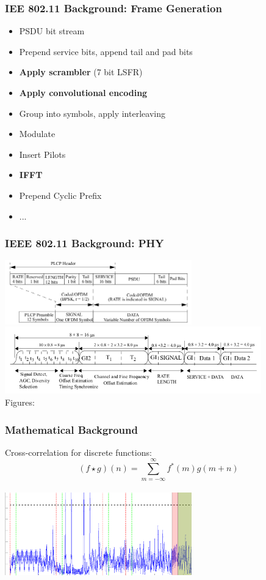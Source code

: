 \documentclass[accentcolor=tud8b,colorbacktitle]{tudbeamer}
\begin{document}
\begin{frame}
\frametitle{IEE 802.11 Background: Frame Generation}
\begin{itemize}
	\item PSDU bit stream
	\item Prepend service bits, append tail and pad bits
	\item \textbf{Apply scrambler} (7 bit LSFR)
	\item \textbf{Apply convolutional encoding}
	\item Group into symbols, apply interleaving
	\item Modulate
	\item Insert Pilots
	\item \textbf{IFFT}
	\item Prepend Cyclic Prefix
	\item ...
\end{itemize}
\end{frame}


\begin{frame}
\frametitle{IEEE 802.11 Background: PHY}
\begin{center}
	\vspace{-0.3cm}
	\includegraphics[width=8.1cm]{assets/phy-format}\\
	\vspace{0.2cm}
	\includegraphics[width=11.1cm]{assets/preamble-format}\\
	\small Figures: \cite{ieee2012}
\end{center}
\end{frame}


\begin{frame}
\frametitle{Mathematical Background}
\begin{center}
Cross-correlation for discrete functions:
$$ (f \star g)(n) = \sum_{m=-\infty}^{\infty} f^{\ast}(m) g(m+n) $$\\
\vspace{0.5cm}
\includegraphics[width=8.1cm]{assets/title-image}
\end{center}
\end{frame}
\end{document}
